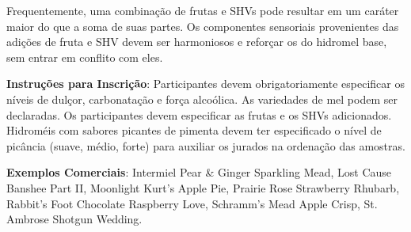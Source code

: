 Frequentemente, uma combinação de frutas e SHVs pode resultar em um caráter maior do que a soma de suas partes. Os componentes sensoriais provenientes das adições de fruta e SHV devem ser harmoniosos e reforçar os do hidromel base, sem entrar em conflito com eles.

\textbf{Instruções para Inscrição}: Participantes devem obrigatoriamente especificar os níveis de dulçor, carbonatação e força alcoólica. As variedades de mel podem ser declaradas. Os participantes devem especificar as frutas e os SHVs adicionados. Hidroméis com sabores picantes de pimenta devem ter especificado o nível de picância (suave, médio, forte) para auxiliar os jurados na ordenação das amostras.

\textbf{Exemplos Comerciais}: Intermiel Pear \& Ginger Sparkling Mead, Lost Cause Banshee Part II, Moonlight Kurt's Apple Pie, Prairie Rose Strawberry Rhubarb, Rabbit's Foot Chocolate Raspberry Love, Schramm's Mead Apple Crisp, St. Ambrose Shotgun Wedding.
